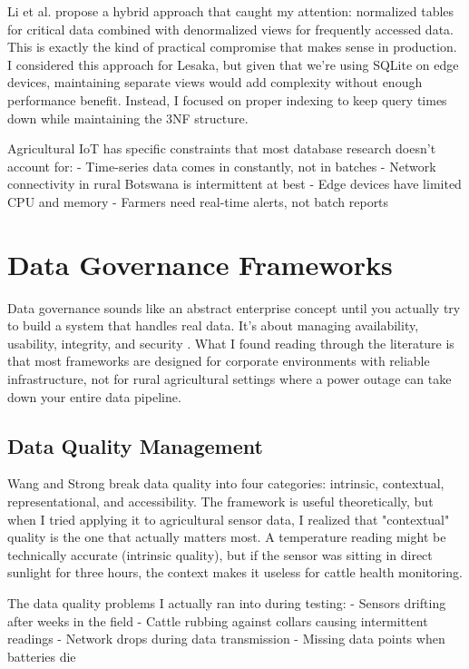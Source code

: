 Li et al. \cite{li2018database} propose a hybrid approach that caught my attention: normalized tables for critical data combined with denormalized views for frequently accessed data. This is exactly the kind of practical compromise that makes sense in production. I considered this approach for Lesaka, but given that we're using SQLite on edge devices, maintaining separate views would add complexity without enough performance benefit. Instead, I focused on proper indexing to keep query times down while maintaining the 3NF structure.

Agricultural IoT has specific constraints that most database research doesn't account for:
- Time-series data comes in constantly, not in batches
- Network connectivity in rural Botswana is intermittent at best
- Edge devices have limited CPU and memory
- Farmers need real-time alerts, not batch reports

\section{Data Governance Frameworks}

Data governance sounds like an abstract enterprise concept until you actually try to build a system that handles real data. It's about managing availability, usability, integrity, and security \cite{damodaran2019data}. What I found reading through the literature is that most frameworks are designed for corporate environments with reliable infrastructure, not for rural agricultural settings where a power outage can take down your entire data pipeline.

\subsection{Data Quality Management}

Wang and Strong \cite{wang1996beyond} break data quality into four categories: intrinsic, contextual, representational, and accessibility. The framework is useful theoretically, but when I tried applying it to agricultural sensor data, I realized that "contextual" quality is the one that actually matters most. A temperature reading might be technically accurate (intrinsic quality), but if the sensor was sitting in direct sunlight for three hours, the context makes it useless for cattle health monitoring.

The data quality problems I actually ran into during testing:
- Sensors drifting after weeks in the field
- Cattle rubbing against collars causing intermittent readings
- Network drops during data transmission
- Missing data points when batteries die

